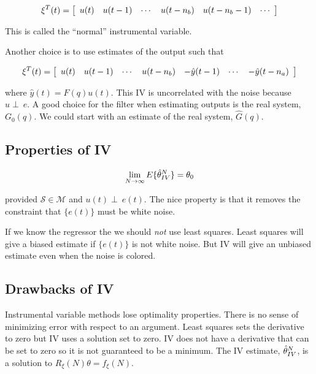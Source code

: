 \begin{equation*}
\xi^T(t) = \left[\begin{array}{c c c c c c} u(t) & u(t-1) & \cdots & u(t-n_b) & u(t-n_b-1) & \cdots \end{array}\right]
\end{equation*}

This is called the ``normal'' instrumental variable.

Another choice is to use estimates of the output such that

\begin{equation*}
\xi^T (t) = \left[\begin{array}{c c c c c c c} u(t) & u(t-1) & \cdots & u(t-n_b) & -\hat{y}(t-1) & \cdots & -\hat{y}(t-n_a) \end{array}\right]
\end{equation*}

where $\hat{y} (t)=F (q) u (t)$.
This IV is uncorrelated with the noise because $u\perp~e$.
A good choice for the filter when estimating outputs is the real system, $G_0(q)$.
We could start with an estimate of the real system, $\hat{G} (q)$.

\subsection{Properties of IV}

\begin{equation*}
\lim_{N\to\infty}E\{\hat{\theta}_{IV}^N\} = \theta_0
\end{equation*}

provided $\mathcal{S}\in\mathcal{M}$ and $u (t)\perp~e (t)$.
The nice property is that it removes the constraint that $\{e (t)\}$ must be white noise.

If we know the regressor the we should \textit{not} use least squares.
Least squares will give a biased estimate if $\{e (t)\}$ is not white noise.
But IV will give an unbiased estimate even when the noise is colored.

\subsection{Drawbacks of IV}
Instrumental variable methods lose optimality properties.
There is no sense of minimizing error with respect to an argument.
Least squares sets the derivative to zero but IV uses a solution set to zero.
IV does not have a derivative that can be set to zero so it is not guaranteed to be a minimum.
The IV estimate, $\hat{\theta}_{IV}^N$, is a solution to $R_\xi(N)\theta=f_\xi(N)$.

